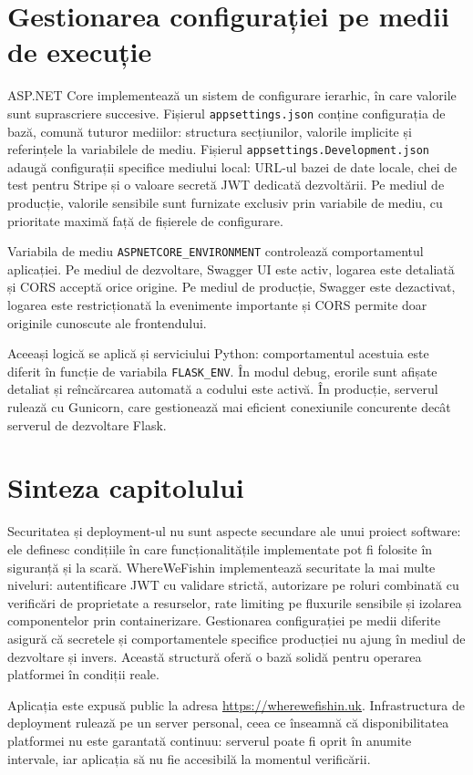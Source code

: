 \section{Gestionarea configurației pe medii de execuție}

ASP.NET Core implementează un sistem de configurare ierarhic, în care valorile sunt suprascriere succesive. Fișierul \texttt{appsettings.json} conține configurația de bază, comună tuturor mediilor: structura secțiunilor, valorile implicite și referințele la variabilele de mediu. Fișierul \texttt{appsettings.Development.json} adaugă configurații specifice mediului local: URL-ul bazei de date locale, chei de test pentru Stripe și o valoare secretă JWT dedicată dezvoltării. Pe mediul de producție, valorile sensibile sunt furnizate exclusiv prin variabile de mediu, cu prioritate maximă față de fișierele de configurare.

Variabila de mediu \texttt{ASPNETCORE\_ENVIRONMENT} controlează comportamentul aplicației. Pe mediul de dezvoltare, Swagger UI este activ, logarea este detaliată și CORS acceptă orice origine. Pe mediul de producție, Swagger este dezactivat, logarea este restricționată la evenimente importante și CORS permite doar originile cunoscute ale frontendului.

Aceeași logică se aplică și serviciului Python: comportamentul acestuia este diferit în funcție de variabila \texttt{FLASK\_ENV}. În modul debug, erorile sunt afișate detaliat și reîncărcarea automată a codului este activă. În producție, serverul rulează cu Gunicorn, care gestionează mai eficient conexiunile concurente decât serverul de dezvoltare Flask.

\section{Sinteza capitolului}

Securitatea și deployment-ul nu sunt aspecte secundare ale unui proiect software: ele definesc condițiile în care funcționalitățile implementate pot fi folosite în siguranță și la scară. WhereWeFishin implementează securitate la mai multe niveluri: autentificare JWT cu validare strictă, autorizare pe roluri combinată cu verificări de proprietate a resurselor, rate limiting pe fluxurile sensibile și izolarea componentelor prin containerizare. Gestionarea configurației pe medii diferite asigură că secretele și comportamentele specifice producției nu ajung în mediul de dezvoltare și invers. Această structură oferă o bază solidă pentru operarea platformei în condiții reale.

Aplicația este expusă public la adresa \url{https://wherewefishin.uk}. Infrastructura de deployment rulează pe un server personal, ceea ce înseamnă că disponibilitatea platformei nu este garantată continuu: serverul poate fi oprit în anumite intervale, iar aplicația să nu fie accesibilă la momentul verificării.
